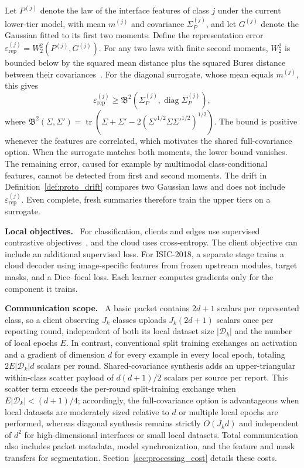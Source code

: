 \begin{remark}
\label{rem:representation_error}
Let $P^{(j)}$ denote the law of the interface features of class $j$ under the current lower-tier model, with mean $m^{(j)}$ and covariance $\Sigma_P^{(j)}$, and let $G^{(j)}$ denote the Gaussian fitted to its first two moments. Define the representation error $\varepsilon_{\mathrm{rep}}^{(j)}=W_2^2(P^{(j)},G^{(j)})$. For any two laws with finite second moments, $W_2^2$ is bounded below by the squared mean distance plus the squared Bures distance between their covariances~\cite{gelbrich1990formula}. For the diagonal surrogate, whose mean equals $m^{(j)}$, this gives
\begin{equation}
 \varepsilon_{\mathrm{rep}}^{(j)}\ge
 \mathfrak B^2\!\left(\Sigma_P^{(j)},\operatorname{diag}\Sigma_P^{(j)}\right),
 \label{eq:representation_error}
\end{equation}
where
$\mathfrak B^2(\Sigma,\Sigma')=\operatorname{tr}\!\left(\Sigma+\Sigma'-2(\Sigma'^{1/2}\Sigma\Sigma'^{1/2})^{1/2}\right)$.
The bound is positive whenever the features are correlated, which motivates the shared full-covariance option. When the surrogate matches both moments, the lower bound vanishes. The remaining error, caused for example by multimodal class-conditional features, cannot be detected from first and second moments. The drift in Definition~\ref{def:proto_drift} compares two Gaussian laws and does not include $\varepsilon_{\mathrm{rep}}^{(j)}$. Even complete, fresh summaries therefore train the upper tiers on a surrogate.
\end{remark}

\noindent\textbf{Local objectives.}~
For classification, clients and edges use supervised contrastive objectives~\cite{khosla2020supervised}, and the cloud uses cross-entropy. The client objective can include an additional supervised loss. For ISIC-2018, a separate stage trains a cloud decoder using image-specific features from frozen upstream modules, target masks, and a Dice--focal loss. Each learner computes gradients only for the component it trains.

\noindent\textbf{Communication scope.}~
A basic packet contains $2d+1$ scalars per represented class, so a client observing $J_k$ classes uploads $J_k(2d+1)$ scalars once per reporting round, independent of both its local dataset size $|\mathcal D_k|$ and the number of local epochs $E$. In contrast, conventional split training exchanges an activation and a gradient of dimension $d$ for every example in every local epoch, totaling $2E|\mathcal D_k|d$ scalars per round. Shared-covariance synthesis adds an upper-triangular within-class scatter payload of $d(d+1)/2$ scalars per source per report. This scatter term exceeds the per-round split-training exchange when $E|\mathcal D_k| < (d+1)/4$; accordingly, the full-covariance option is advantageous when local datasets are moderately sized relative to $d$ or multiple local epochs are performed, whereas diagonal synthesis remains strictly $O(J_k d)$ and independent of $d^2$ for high-dimensional interfaces or small local datasets. Total communication also includes packet metadata, model synchronization, and the feature and mask transfers for segmentation. Section~\ref{sec:processing_cost} details these costs.
